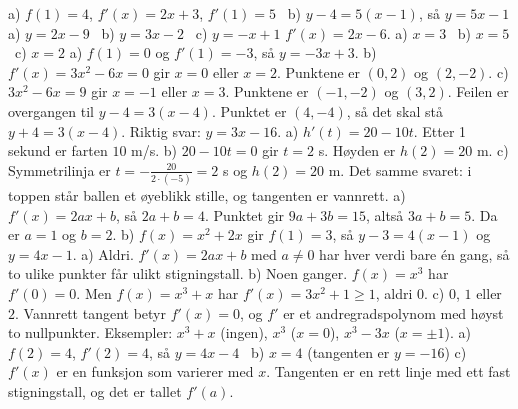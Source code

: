  a) $f(1) = 4$, $f'(x) = 2x + 3$, $f'(1) = 5$ \ b) $y - 4 = 5(x - 1)$, så $y = 5x - 1$
 a) $y = 2x - 9$ \ b) $y = 3x - 2$ \ c) $y = -x + 1$
 $f'(x) = 2x - 6$. a) $x = 3$ \ b) $x = 5$ \ c) $x = 2$
 a) $f(1) = 0$ og $f'(1) = -3$, så $y = -3x + 3$.
b) $f'(x) = 3x^2 - 6x = 0$ gir $x = 0$ eller $x = 2$. Punktene er $(0, 2)$ og $(2, -2)$.
c) $3x^2 - 6x = 9$ gir $x = -1$ eller $x = 3$. Punktene er $(-1, -2)$ og $(3, 2)$.
 Feilen er overgangen til $y - 4 = 3(x - 4)$. Punktet er $(4, -4)$, så det skal stå $y + 4 = 3(x - 4)$. Riktig svar: $y = 3x - 16$.
 a) $h'(t) = 20 - 10t$. Etter 1 sekund er farten $10$ m/s.
b) $20 - 10t = 0$ gir $t = 2$ s. Høyden er $h(2) = 20$ m.
c) Symmetrilinja er $t = -\frac{20}{2\cdot(-5)} = 2$ s og $h(2) = 20$ m. Det samme svaret: i toppen står ballen et øyeblikk stille, og tangenten er vannrett.
 a) $f'(x) = 2ax + b$, så $2a + b = 4$. Punktet gir $9a + 3b = 15$, altså $3a + b = 5$. Da er $a = 1$ og $b = 2$.
b) $f(x) = x^2 + 2x$ gir $f(1) = 3$, så $y - 3 = 4(x - 1)$ og $y = 4x - 1$.
 a) Aldri. $f'(x) = 2ax + b$ med $a \neq 0$ har hver verdi bare én gang, så to ulike punkter får ulikt stigningstall.
b) Noen ganger. $f(x) = x^3$ har $f'(0) = 0$. Men $f(x) = x^3 + x$ har $f'(x) = 3x^2 + 1 \ge 1$, aldri $0$.
c) $0$, $1$ eller $2$. Vannrett tangent betyr $f'(x) = 0$, og $f'$ er et andregradspolynom med høyst to nullpunkter. Eksempler: $x^3 + x$ (ingen), $x^3$ ($x = 0$), $x^3 - 3x$ ($x = \pm 1$).
 a) $f(2) = 4$, $f'(2) = 4$, så $y = 4x - 4$ \ b) $x = 4$ (tangenten er $y = -16$)
c) $f'(x)$ er en funksjon som varierer med $x$. Tangenten er en rett linje med ett fast stigningstall, og det er tallet $f'(a)$.

